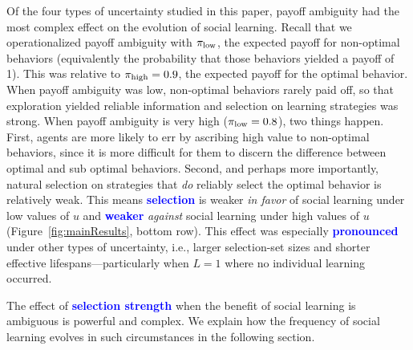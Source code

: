 \documentclass[letterpaper,11.5pt]{scrartcl}
\newcommand{\cm}[1]{{\textcolor{mypurple} {({\tiny CM:} #1)}}}
\newcommand{\edit}[1]{{\bfseries \textcolor{blue} {#1}}}
\begin{document}
Of the four types of uncertainty studied in this paper, payoff ambiguity had the most
complex effect on the evolution of social learning. Recall that we operationalized
payoff ambiguity with $\pi_{\mathrm{low}}$, the expected payoff for non-optimal behaviors
(equivalently the probability that those behaviors yielded a payoff of 1). This was
relative to $\pi_{\mathrm{high}} = 0.9$, the expected payoff for the optimal behavior. When
payoff ambiguity was low, non-optimal behaviors rarely paid off, so that exploration
yielded reliable information and selection on learning strategies was strong. When
payoff ambiguity is very high ($\pi_{\mathrm{low}} = 0.8$), two things happen. First, agents are
more likely to err by ascribing high value to non-optimal behaviors, since it is
more difficult for them to discern the difference between optimal and sub optimal
behaviors. Second, and perhaps more importantly, natural selection on strategies
that \emph{do} reliably select the optimal behavior is relatively weak. This means
\edit{selection} is weaker \emph{in favor} of social learning under low values of $u$ and
\edit{weaker} \emph{against} social learning under high values of $u$ (Figure~\ref{fig:mainResults}, bottom row). 
This effect was especially \edit{pronounced} under other types of uncertainty, i.e., larger selection-set sizes and shorter effective lifespans---particularly when $L=1$ where no individual learning occurred. 

The effect of \edit{selection strength} when the benefit of social learning is ambiguous is powerful and complex. We explain how the frequency of social learning evolves in such circumstances in the following section.
\end{document}
